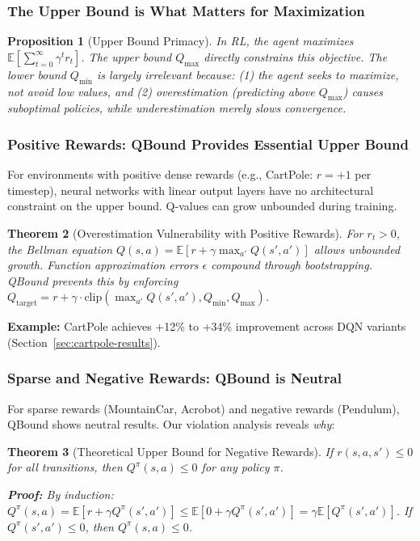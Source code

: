 \documentclass[11pt]{article}
\newtheorem{theorem}{Theorem}
\newtheorem{proposition}[theorem]{Proposition}
\theoremstyle{definition}
\theoremstyle{remark}
\begin{document}
\subsubsection{The Upper Bound is What Matters for Maximization}

\begin{proposition}[Upper Bound Primacy]
In RL, the agent maximizes $\mathbb{E}[\sum_{t=0}^\infty \gamma^t r_t]$. The upper bound $Q_{\max}$ directly constrains this objective. The lower bound $Q_{\min}$ is largely irrelevant because: (1) the agent seeks to \textit{maximize}, not avoid low values, and (2) overestimation (predicting above $Q_{\max}$) causes suboptimal policies, while underestimation merely slows convergence.
\end{proposition}

\subsubsection{Positive Rewards: QBound Provides Essential Upper Bound}

For environments with positive dense rewards (e.g., CartPole: $r = +1$ per timestep), neural networks with linear output layers have no architectural constraint on the upper bound. Q-values can grow unbounded during training.

\begin{theorem}[Overestimation Vulnerability with Positive Rewards]
For $r_t > 0$, the Bellman equation $Q(s,a) = \mathbb{E}[r + \gamma \max_{a'} Q(s',a')]$ allows unbounded growth. Function approximation errors $\epsilon$ compound through bootstrapping. QBound prevents this by enforcing $Q_{\text{target}} = r + \gamma \cdot \text{clip}(\max_{a'} Q(s',a'), Q_{\min}, Q_{\max})$.
\end{theorem}

\textbf{Example:} CartPole achieves +12\% to +34\% improvement across DQN variants (Section~\ref{sec:cartpole-results}).

\subsubsection{Sparse and Negative Rewards: QBound is Neutral}

For sparse rewards (MountainCar, Acrobot) and negative rewards (Pendulum), QBound shows neutral results. Our violation analysis reveals \textit{why}:

\begin{theorem}[Theoretical Upper Bound for Negative Rewards]
\label{thm:negative-reward-bound}
If $r(s,a,s') \leq 0$ for all transitions, then $Q^\pi(s,a) \leq 0$ for any policy $\pi$.

\textbf{Proof:} By induction: $Q^\pi(s,a) = \mathbb{E}[r + \gamma Q^\pi(s',a')] \leq \mathbb{E}[0 + \gamma Q^\pi(s',a')] = \gamma \mathbb{E}[Q^\pi(s',a')]$. If $Q^\pi(s',a') \leq 0$, then $Q^\pi(s,a) \leq 0$.
\end{theorem}
\end{document}
